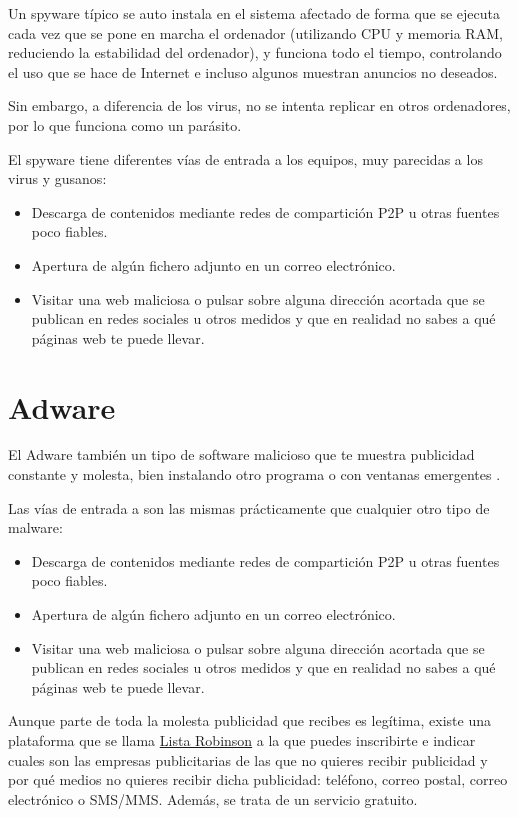\documentclass[
  spanish,
  a4paper,
  openany]{book}
\begin{document}
Un spyware típico se auto instala en el sistema afectado de forma que se ejecuta cada vez que se pone en marcha el ordenador (utilizando CPU y memoria RAM, reduciendo la estabilidad del ordenador), y funciona todo el tiempo, controlando el uso que se hace de Internet e incluso algunos muestran anuncios no deseados.

Sin embargo, a diferencia de los virus, no se intenta replicar en otros ordenadores, por lo que funciona como un parásito.

El spyware tiene diferentes vías de entrada a los equipos, muy parecidas a los virus y gusanos:

\begin{itemize}
\item
  Descarga de contenidos mediante redes de compartición P2P u otras fuentes poco fiables.
\item
  Apertura de algún fichero adjunto en un correo electrónico.
\item
  Visitar una web maliciosa o pulsar sobre alguna dirección acortada que se publican en redes sociales u otros medidos y que en realidad no sabes a qué páginas web te puede llevar.
\end{itemize}

\hypertarget{adware}{%
\section{Adware}\label{adware}}

El Adware también un tipo de software malicioso que te muestra publicidad constante y molesta, bien instalando otro programa o con ventanas emergentes \citep{AVAST-adware}.

Las vías de entrada a son las mismas prácticamente que cualquier otro tipo de malware:

\begin{itemize}
\item
  Descarga de contenidos mediante redes de compartición P2P u otras fuentes poco fiables.
\item
  Apertura de algún fichero adjunto en un correo electrónico.
\item
  Visitar una web maliciosa o pulsar sobre alguna dirección acortada que se publican en redes sociales u otros medidos y que en realidad no sabes a qué páginas web te puede llevar.
\end{itemize}

Aunque parte de toda la molesta publicidad que recibes es legítima, existe una plataforma que se llama \href{https://www.listarobinson.es/}{Lista Robinson} a la que puedes inscribirte e indicar cuales son las empresas publicitarias de las que no quieres recibir publicidad y por qué medios no quieres recibir dicha publicidad: teléfono, correo postal, correo electrónico o SMS/MMS. Además, se trata de un servicio gratuito.
\end{document}

